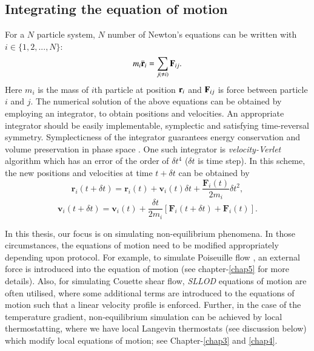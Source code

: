     \subsection{Integrating the equation of motion}
    
    For a $N$ particle system, $N$ number of Newton's equations can be written with $i \in \{1, 2, ..., N\}$:
    \begin{equation}
        m_i \ddot{\bf r}_i = \sum_{j(\neq i)} {\bf F}_{ij}.
    \end{equation}
    Here $m_i$ is the mass of $i$th particle at position ${\bf r}_i$ and ${\bf F}_{ij}$ is force between particle $i$ and $j$. The numerical solution of the above equations can be obtained by employing an integrator, to obtain positions and velocities. An appropriate integrator should be easily implementable, symplectic and satisfying time-reversal symmetry. Symplecticness of the integrator guarantees energy conservation and volume preservation in phase space \cite{bond1999nose}. One such integrator is {\em velocity-Verlet} \cite{verlet1967computer} algorithm which has an error of the order of $\delta t^4$ ($\delta t$ is time step). In this scheme, the new positions and velocities at time $t + \delta t$ can be obtained by
    \begin{equation}
        \textbf{r}_i(t+\delta t) = \textbf{r}_i(t) + \textbf{v}_i(t)\delta t + \frac{\textbf{F}_i(t)}{2m_i}\delta t^2,
    \end{equation}
    \begin{equation}
        \textbf{v}_i(t+\delta t) = \textbf{v}_i(t) + \frac{\delta t}{2m_i} [\textbf{F}_i(t+\delta t) + \textbf{F}_i(t)].
    \end{equation}

    In this thesis, our focus is on simulating non-equilibrium phenomena. In those circumstances,  the equations of motion need to be modified appropriately depending upon protocol. For example, to simulate Poiseuille flow \cite{evansMorrissBook,todd1995,todd1995pressure}, an external force is introduced into the equation of motion (see chapter-\ref{chap5} for more details). Also, for simulating Couette shear flow, {\em SLLOD} equations of motion \cite{evans1984nonlinear,evansMorrissBook} are often utilised, where some additional terms are introduced to the equations of motion such that a linear velocity profile is enforced. Further, in the case of the temperature gradient, non-equilibrium simulation can be achieved by local thermostatting, where we have local Langevin thermostats (see discussion below) which modify local equations of motion; see  Chapter-\ref{chap3} and \ref{chap4}. 
    
